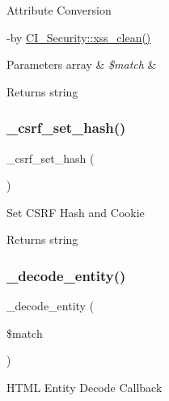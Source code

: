 Attribute Conversion

-\/by \mbox{\hyperlink{class_c_i___security_acb759426dbab128d3d8164805225381c}{C\+I\+\_\+\+Security\+::xss\+\_\+clean()}} 
\begin{DoxyParams}[1]{Parameters}
array & {\em \$match} & \\
\hline
\end{DoxyParams}
\begin{DoxyReturn}{Returns}
string 
\end{DoxyReturn}
\mbox{\label{class_c_i___security_a7064dd5501c1dfab05ba6ac8838beb01}} 
\subsubsection{\texorpdfstring{\+\_\+csrf\+\_\+set\+\_\+hash()}{\_csrf\_set\_hash()}}
{\footnotesize\ttfamily \+\_\+csrf\+\_\+set\+\_\+hash (\begin{DoxyParamCaption}{ }\end{DoxyParamCaption})\hspace{0.3cm}{\ttfamily [protected]}}

Set C\+S\+RF Hash and Cookie

\begin{DoxyReturn}{Returns}
string 
\end{DoxyReturn}
\mbox{\label{class_c_i___security_a5289832cb3ae9cee3c12e82ede958874}} 
\subsubsection{\texorpdfstring{\+\_\+decode\+\_\+entity()}{\_decode\_entity()}}
{\footnotesize\ttfamily \+\_\+decode\+\_\+entity (\begin{DoxyParamCaption}\item[{}]{\$match }\end{DoxyParamCaption})\hspace{0.3cm}{\ttfamily [protected]}}

H\+T\+ML Entity Decode Callback


